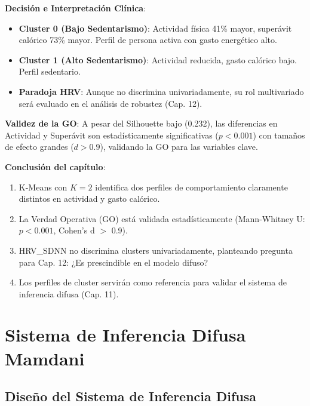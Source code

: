 \documentclass[12pt,letterpaper,twoside]{report}
\begin{document}
\begin{decisionbox}
\textbf{Decisión e Interpretación Clínica}:

\begin{itemize}[noitemsep]
    \item \textbf{Cluster 0 (Bajo Sedentarismo)}: Actividad física 41\% mayor, superávit calórico 73\% mayor. Perfil de persona activa con gasto energético alto.
    \item \textbf{Cluster 1 (Alto Sedentarismo)}: Actividad reducida, gasto calórico bajo. Perfil sedentario.
    \item \textbf{Paradoja HRV}: Aunque no discrimina univariadamente, su rol multivariado será evaluado en el análisis de robustez (Cap. 12).
\end{itemize}

\textbf{Validez de la GO}: A pesar del Silhouette bajo (0.232), las diferencias en Actividad y Superávit son estadísticamente significativas ($p<0.001$) con tamaños de efecto grandes ($d>0.9$), validando la GO para las variables clave.
\end{decisionbox}

\begin{conclusionbox}
\textbf{Conclusión del capítulo}:

\begin{enumerate}[noitemsep]
    \item K-Means con $K=2$ identifica dos perfiles de comportamiento claramente distintos en actividad y gasto calórico.
    \item La Verdad Operativa (GO) está validada estadísticamente (Mann-Whitney U: $p<0.001$, Cohen's d $>$ 0.9).
    \item HRV\_SDNN no discrimina clusters univariadamente, planteando pregunta para Cap. 12: ¿Es prescindible en el modelo difuso?
    \item Los perfiles de cluster servirán como referencia para validar el sistema de inferencia difusa (Cap. 11).
\end{enumerate}
\end{conclusionbox}

\chapter{Sistema de Inferencia Difusa Mamdani}

\section{Diseño del Sistema de Inferencia Difusa}
\end{document}
